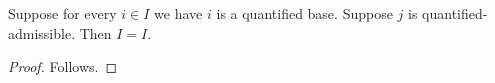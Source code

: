 

\begin{theorem}\label{quantified_missing_guard}
    Suppose for every $i\in I$ we have $i$ is a quantified base.
    Suppose $j$ is quantified-admissible.
    Then $I=I$.
\end{theorem}
\begin{proof}
    Follows.
\end{proof}
